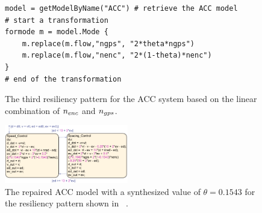 %
\begin{figure}[t!]%
\begin{lstlisting}[basicstyle=\ttfamily\footnotesize, numbers=none]
model = getModelByName("ACC") # retrieve the ACC model
# start a transformation  
formode m = model.Mode {
    m.replace(m.flow,"ngps", "2*theta*ngps")
    m.replace(m.flow,"nenc", "2*(1-theta)*nenc")
}
# end of the transformation
\end{lstlisting}
\caption{The third resiliency pattern for the ACC system based on the linear combination of $n_{enc}$ and $n_{gps}$.}%
%
	
\end{figure}
\begin{figure}[tbp]%
	\centering%
    \includegraphics[width=0.48\textwidth]{image/acc_model_pat3}%
	\caption{The repaired ACC model with a synthesized value of $\theta = 0.1543$ for the resiliency pattern shown in ~.}%
	\vspace{-1em}
\end{figure}%


